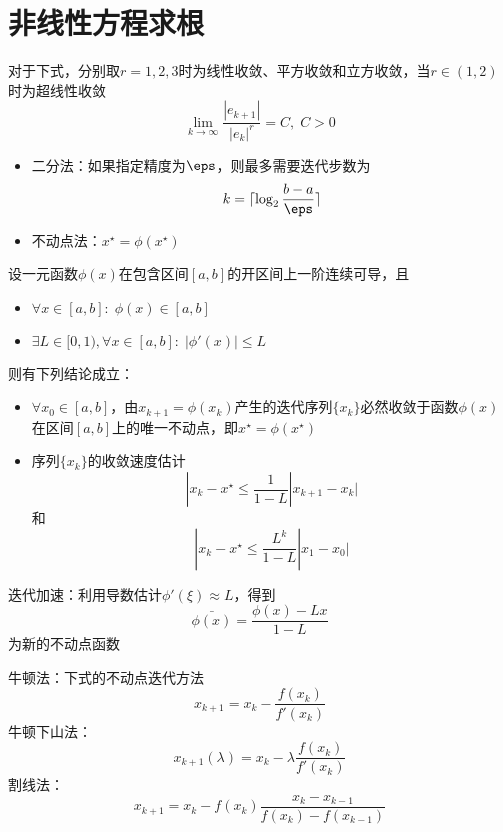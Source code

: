 
\section{非线性方程求根}
对于下式，分别取$r=1,2,3$时为线性收敛、平方收敛和立方收敛，当$r\in(1,2)$时为超线性收敛
\[\lim_{k\to\infty}\frac{|e_{k+1}|}{|e_k|^r}=C,\;C>0\]

\begin{itemize}
\item 二分法：如果指定精度为$\eps$，则最多需要迭代步数为
\[k=\lceil\log_2\frac{b-a}{\eps}\rceil\]
\item 不动点法：$x^\star=\phi(x^\star)$
\end{itemize}
\begin{theorem}
    设一元函数$\phi(x)$在包含区间$[a,b]$的开区间上一阶连续可导，且
    \begin{itemize}
        \item $\forall x\in[a,b]:\;\phi(x)\in[a,b]$
        \item $\exists L\in[0,1),\forall x\in[a,b]:\;|\phi'(x)|\leq L$
    \end{itemize}
    则有下列结论成立：
    \begin{itemize}
        \item $\forall x_0\in[a,b]$，由$x_{k+1}=\phi(x_k)$产生的迭代序列$\{x_k\}$必然收敛于函数$\phi(x)$在区间$[a,b]$上的唯一不动点，即$x^\star=\phi(x^\star)$
        \item 序列$\{x_k\}$的收敛速度估计
        \[|x_k-x^\star\leq\frac{1}{1-L}|x_{k+1}-x_k|\]
        和
        \[|x_k-x^\star\leq\frac{L^k}{1-L}|x_1-x_0|\]
    \end{itemize}
\end{theorem}

迭代加速：利用导数估计$\phi'(\xi)\approx L$，得到
\[\bar{\phi(x)}=\frac{\phi(x)-Lx}{1-L}\]
为新的不动点函数

牛顿法：下式的不动点迭代方法
\[x_{k+1}=x_{k}-\frac{f(x_k)}{f'(x_k)}\]
牛顿下山法：
\[x_{k+1}(\lambda)=x_k-\lambda\frac{f(x_k)}{f'(x_k)}\]
割线法：
\[x_{k+1}=x_k-f(x_k)\frac{x_k-x_{k-1}}{f(x_k)-f(x_{k-1})}\]
